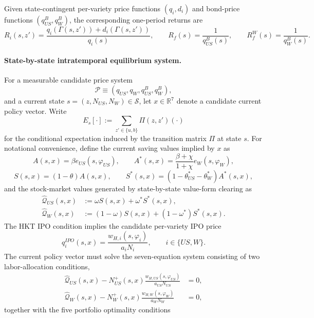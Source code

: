 \documentclass{article}
\begin{document}
Given state-contingent per-variety price functions $(q_i,d_i)$ and bond-price functions $(q^B_{US},q^B_W)$, the corresponding one-period returns are
\begin{equation}\label{recursive_returns}
R_i(s,z')
=
\frac{q_i(\Gamma(s,z'))+d_i(\Gamma(s,z'))}{q_i(s)},
\qquad
R_f(s)=\frac{1}{q^B_{US}(s)},
\qquad
R_f^W(s)=\frac{1}{q^B_W(s)}.
\end{equation}

\paragraph{State-by-state intratemporal equilibrium system.}
For a measurable candidate price system
\[
\mathcal P\equiv(q_{US},q_W,q^B_{US},q^B_W),
\]
and a current state $s=(z,N_{US},N_W)\in\mathcal S$, let $x\in\mathbb R^7$ denote a candidate current policy vector. Write
\[
E_s[\cdot]:=\sum_{z'\in\{u,b\}}\Pi(z,z')(\cdot)
\]
for the conditional expectation induced by the transition matrix $\Pi$ at state $s$. For notational convenience, define the current saving values implied by $x$ as
\[
A(s,x)=\beta e_{US}(s,\varphi_{US}),
\qquad
A^*(s,x)=\frac{\beta+\chi}{1+\chi}e_W(s,\varphi_W),
\]
\[
S(s,x)=(1-\theta)A(s,x),
\qquad
S^*(s,x)=(1-\theta_{US}^*-\theta_W^*)A^*(s,x),
\]
and the stock-market values generated by state-by-state value-form clearing as
\begin{align}
\widehat{\mathcal Q}_{US}(s,x)
&:=\omega S(s,x)+\omega^*S^*(s,x),
\label{intratemporal_QUS}\\
\widehat{\mathcal Q}_{W}(s,x)
&:=(1-\omega)S(s,x)+(1-\omega^*)S^*(s,x).
\label{intratemporal_QW}
\end{align}
The HKT IPO condition implies the candidate per-variety IPO price
\[
q_i^{IPO}(s,x)=\frac{w_{H,i}(s,\varphi_i)}{a_iN_i},
\qquad
i\in\{US,W\}.
\]
The current policy vector must solve the seven-equation system consisting of two labor-allocation conditions,
\begin{align}
\widehat{\mathcal Q}_{US}(s,x)
-
N_{US}^+(s,x)\frac{w_{H,US}(s,\varphi_{US})}{a_{US}N_{US}}
&=0,
\label{intratemporal_phi_US}\\
\widehat{\mathcal Q}_{W}(s,x)
-
N_W^+(s,x)\frac{w_{H,W}(s,\varphi_W)}{a_WN_W}
&=0,
\label{intratemporal_phi_W}
\end{align}
together with the five portfolio optimality conditions
\end{document}
